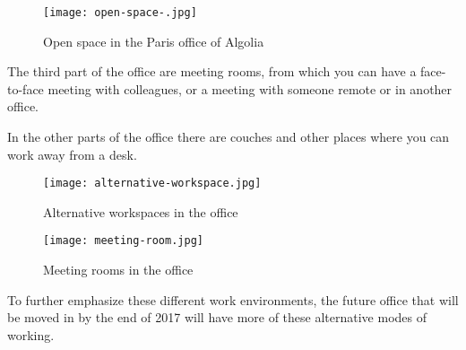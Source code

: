 \begin{figure}[H]
  \centering
  \texttt{[image: open-space-.jpg]}
  \caption{Open space in the Paris office of Algolia}
  \label{figure:algolia-open-space}
\end{figure}

The third part of the office are meeting rooms, from which you can have a face-to-face meeting with colleagues, or a meeting with someone remote or in another office.

In the other parts of the office there are couches and other places where you can work away from a desk.

\begin{figure}[H]
\centering
\begin{minipage}{.5\textwidth}
  \centering
  \texttt{[image: alternative-workspace.jpg]}
  \caption{Alternative workspaces in the office}
  \label{figure:algolia-alternative-space}
\end{minipage}%
\begin{minipage}{.5\textwidth}
  \centering
  \texttt{[image: meeting-room.jpg]}
  \caption{Meeting rooms in the office}
  \label{figure:algolia-meeting-rooms}
\end{minipage}
\end{figure}

To further emphasize these different work environments, the future office that will be moved in by the end of 2017 will have more of these alternative modes of working. %
